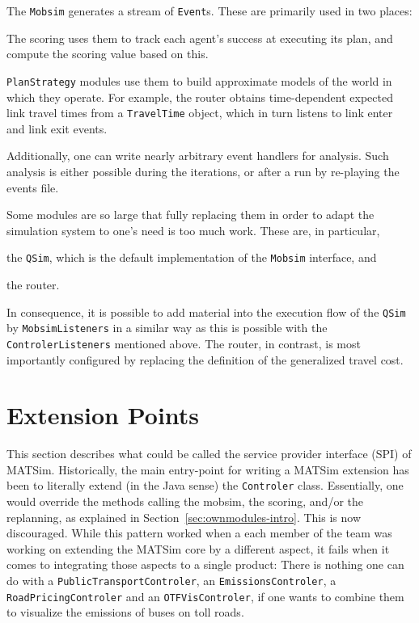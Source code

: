 The \lstinline$Mobsim$ generates a stream of \lstinline$Event$s. These are primarily used in two places:
\begin{compactitem}
\item The scoring uses them to track each agent's success at executing its plan, and compute the scoring value based on this.
\item \lstinline$PlanStrategy$ modules use them to build approximate models of the world in which they operate.  For example, the router obtains time-dependent expected link travel times from a \lstinline$TravelTime$ object, which in turn listens to link enter and link exit events.
  
\end{compactitem}
Additionally, one can write nearly arbitrary event handlers for analysis.
Such analysis is either possible during the iterations, or after a run by re-playing the events file.


Some modules are so large that fully replacing them in order to adapt the simulation system to one's need is too much work.  These are, in particular,
\begin{compactitem}
\item the \lstinline$QSim$, which is the default implementation of the \lstinline$Mobsim$ interface, and
\item the router.
\end{compactitem}
In consequence, it is possible to add material into the execution flow of the \lstinline$QSim$ by \lstinline$MobsimListeners$ in a similar way as this is possible with the \lstinline$ControlerListeners$ mentioned above.
%
The router, in contrast, is most importantly configured by replacing the definition of the generalized travel cost. 

\section{Extension Points}
This section describes what could be called the service provider interface (SPI) of MATSim.
Historically, the main entry-point for writing a MATSim extension has been to literally extend (in the Java sense)
the \lstinline|Controler| class.  Essentially, one would override the methods calling the mobsim, the scoring, and/or the replanning, as explained in Section~\ref{sec:ownmodules-intro}. This is now discouraged. While this pattern worked when a each member of the team
was working on extending the MATSim core by a different aspect, it fails when it comes to
integrating those aspects to a single product: There is nothing one can do with a \lstinline|PublicTransportControler|, an \lstinline|EmissionsControler|, a \lstinline|RoadPricingControler| and an \lstinline|OTFVisControler|, if one wants to combine them to visualize the emissions of buses on toll roads.


